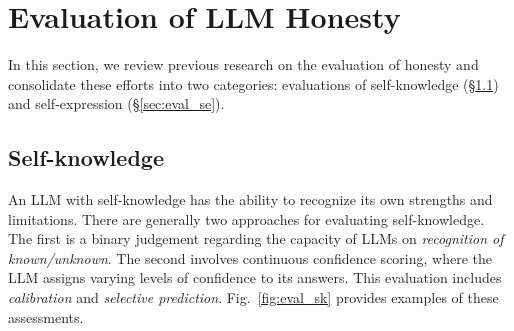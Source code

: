 \section{Evaluation of LLM Honesty}
\label{sec:evaluation}

In this section, we review previous research on the evaluation of honesty and consolidate these efforts into two categories: evaluations of self-knowledge (\S\ref{sec:eval_sk}) and self-expression (\S\ref{sec:eval_se}).

\subsection{Self-knowledge}
\label{sec:eval_sk}

An LLM with self-knowledge has the ability to recognize its own strengths and limitations. There are generally two approaches for evaluating self-knowledge. The first is a binary judgement regarding the capacity of LLMs on \emph{recognition of known/unknown}. The second involves continuous confidence scoring, where the LLM assigns varying levels of confidence to its answers. This evaluation includes \emph{calibration} and \emph{selective prediction}. Fig.~\ref{fig:eval_sk} provides examples of these assessments.

